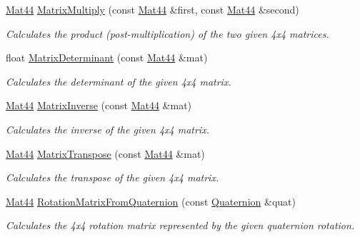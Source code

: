 {\bf }\par
\begin{DoxyCompactItemize}
\item 
\hyperlink{classgfxmath_1_1_mat44}{Mat44} \hyperlink{group___s_i_s_d_mat_math_ga4439d3f4590c372ada775196d1576f81}{Matrix\+Multiply} (const \hyperlink{classgfxmath_1_1_mat44}{Mat44} \&first, const \hyperlink{classgfxmath_1_1_mat44}{Mat44} \&second)
\begin{DoxyCompactList}\small\item\em Calculates the product (post-\/multiplication) of the two given 4x4 matrices. \end{DoxyCompactList}\item 
float \hyperlink{group___s_i_s_d_mat_math_ga285829d964b38ad14730e85c325e775c}{Matrix\+Determinant} (const \hyperlink{classgfxmath_1_1_mat44}{Mat44} \&mat)
\begin{DoxyCompactList}\small\item\em Calculates the determinant of the given 4x4 matrix. \end{DoxyCompactList}\item 
\hyperlink{classgfxmath_1_1_mat44}{Mat44} \hyperlink{group___s_i_s_d_mat_math_ga38c661c8ad19528520d36fabca7d555f}{Matrix\+Inverse} (const \hyperlink{classgfxmath_1_1_mat44}{Mat44} \&mat)
\begin{DoxyCompactList}\small\item\em Calculates the inverse of the given 4x4 matrix. \end{DoxyCompactList}\item 
\hyperlink{classgfxmath_1_1_mat44}{Mat44} \hyperlink{group___s_i_s_d_mat_math_ga626e52b58fb763a90ba6e9d46966ee75}{Matrix\+Transpose} (const \hyperlink{classgfxmath_1_1_mat44}{Mat44} \&mat)
\begin{DoxyCompactList}\small\item\em Calculates the transpose of the given 4x4 matrix. \end{DoxyCompactList}\item 
\hyperlink{classgfxmath_1_1_mat44}{Mat44} \hyperlink{group___s_i_s_d_mat_math_gad7198c521a4d93e82694f39f0be736c9}{Rotation\+Matrix\+From\+Quaternion} (const \hyperlink{classgfxmath_1_1_quaternion}{Quaternion} \&quat)
\begin{DoxyCompactList}\small\item\em Calculates the 4x4 rotation matrix represented by the given quaternion rotation. \end{DoxyCompactList}\item 

\end{DoxyCompactItemize}
